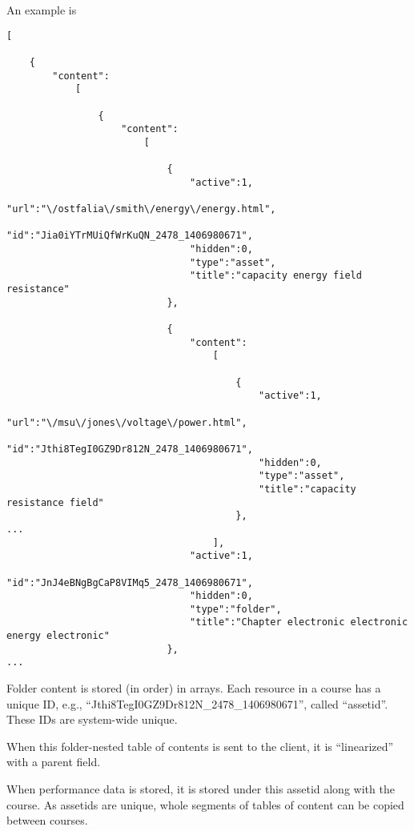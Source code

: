 An example is
\begin{verbatim}
[
    
    {
        "content":
            [
                
                {
                    "content":
                        [
                            
                            {
                                "active":1,
                                "url":"\/ostfalia\/smith\/energy\/energy.html",
                                "id":"Jia0iYTrMUiQfWrKuQN_2478_1406980671",
                                "hidden":0,
                                "type":"asset",
                                "title":"capacity energy field resistance"
                            },
                            
                            {
                                "content":
                                    [
                                        
                                        {
                                            "active":1,
                                            "url":"\/msu\/jones\/voltage\/power.html",
                                            "id":"Jthi8TegI0GZ9Dr812N_2478_1406980671",
                                            "hidden":0,
                                            "type":"asset",
                                            "title":"capacity resistance field"
                                        },
...
                                    ],
                                "active":1,
                                "id":"JnJ4eBNgBgCaP8VIMq5_2478_1406980671",
                                "hidden":0,
                                "type":"folder",
                                "title":"Chapter electronic electronic energy electronic"
                            },
...
\end{verbatim}
Folder content is stored (in order) in arrays. Each resource in a course has a unique ID, e.g., ``Jthi8TegI0GZ9Dr812N\_2478\_1406980671'', called ``assetid''.  These IDs are system-wide unique.

When this folder-nested table of contents is sent to the client, it is ``linearized'' with a parent field.

When performance data is stored, it is stored under this assetid along with the course. As assetids are unique, whole segments of tables of content can be copied between courses.


